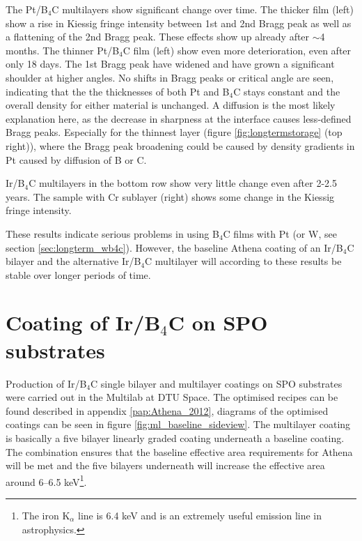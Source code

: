 The Pt/B$_4$C multilayers show significant change over time. The thicker film (left) show a rise in Kiessig fringe intensity between 1st and 2nd Bragg peak as well as a flattening of the 2nd Bragg peak. These effects show up already after $\sim$4 months. The thinner Pt/B$_4$C film (left) show even more deterioration, even after only 18 days. The 1st Bragg peak have widened and have grown a significant shoulder at higher angles. No shifts in Bragg peaks or critical angle are seen, indicating that the the thicknesses of both Pt and B$_4$C stays constant and the overall density for either material is unchanged. A diffusion is the most likely explanation here, as the decrease in sharpness at the interface causes less-defined Bragg peaks. Especially for the thinnest layer (figure \ref{fig:longtermstorage} (top right)), where the Bragg peak broadening could be caused by density gradients in Pt caused by diffusion of B or C.

Ir/B$_4$C multilayers in the bottom row show very little change even after 2-2.5 years. The sample with Cr sublayer (right) shows some change in the Kiessig fringe intensity.

These results indicate serious problems in using B$_4$C films with Pt (or W, see section \ref{sec:longterm_wb4c}). However, the baseline Athena coating of an Ir/B$_4$C bilayer and the alternative Ir/B$_4$C multilayer will according to these results be stable over longer periods of time.

\section{Coating of Ir/B$_4$C on SPO substrates}
Production of Ir/B$_4$C single bilayer and multilayer coatings on SPO substrates were carried out in the Multilab at DTU Space. The optimised recipes can be found described in appendix \ref{pap:Athena_2012}, diagrams of the optimised coatings can be seen in figure \ref{fig:ml_baseline_sideview}. The multilayer coating is basically a five bilayer linearly graded coating underneath a baseline coating. The combination ensures that the baseline effective area requirements for Athena will be met and the five bilayers underneath will increase the effective area around 6--6.5 keV\footnote{The iron K$_{\alpha}$ line is 6.4 keV and is an extremely useful emission line in astrophysics.}.

